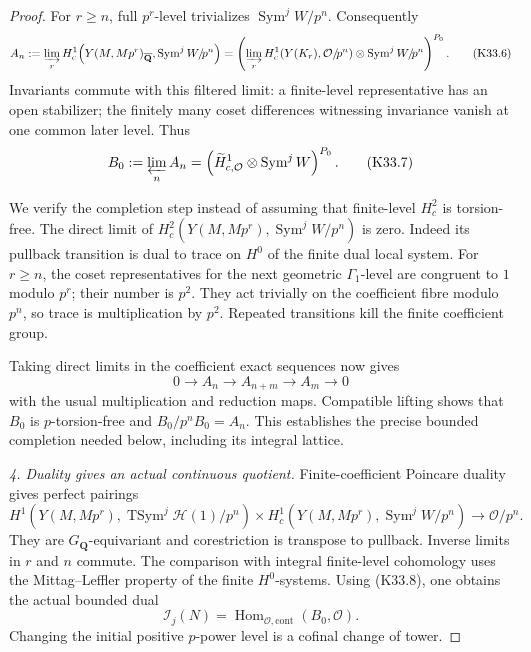 \begin{proof}
For \(r\geq n\), full \(p^r\)-level trivializes
\(\operatorname{Sym}^j W/\!p^n\).  Consequently
\[
 A_n:=\varinjlim_r
 H_c^1\!\left(Y(M,Mp^r)_{\overline{\mathbf Q}},
       \operatorname{Sym}^j W/\!p^n\right)
 =
 \left(\varinjlim_r H_c^1(Y(K_r),\mathcal O/\!p^n)
       \otimes\operatorname{Sym}^j W/\!p^n\right)^{P_0}.
 \tag{K33.6}
\]
Invariants commute with this filtered limit: a finite-level
representative has an open stabilizer; the finitely many
coset differences witnessing invariance vanish at one common
later level.  Thus
\[
 B_0:=\varprojlim_n A_n
   =\left(\widetilde H_{c,\mathcal O}^1
        \otimes\operatorname{Sym}^j W\right)^{P_0}.
 \tag{K33.7}
\]

We verify the completion step instead of assuming that finite-level
\(H_c^2\) is torsion-free.  The direct limit of
\(H_c^2(Y(M,Mp^r),\operatorname{Sym}^j W/\!p^n)\) is zero.
Indeed its pullback transition is dual to trace on \(H^0\) of
the finite dual local system.  For \(r\geq n\), the coset
representatives for the next geometric \(\Gamma_1\)-level
are congruent to \(1\) modulo \(p^r\); their number is \(p^2\).
They act trivially on the coefficient fibre modulo \(p^n\),
so trace is multiplication by \(p^2\).  Repeated transitions
kill the finite coefficient group.

Taking direct limits in the coefficient exact sequences now gives
\[
 0\longrightarrow A_n\longrightarrow A_{n+m}
       \longrightarrow A_m\longrightarrow0
 \tag{K33.8}
\]
with the usual multiplication and reduction maps.
Compatible lifting shows that \(B_0\) is \(p\)-torsion-free
and \(B_0/p^nB_0=A_n\).  This establishes the precise bounded
completion needed below, including its integral lattice.

\emph{4. Duality gives an actual continuous quotient.}
Finite-coefficient Poincare duality gives perfect pairings
\[
 H^1\!\left(Y(M,Mp^r),
       \operatorname{TSym}^j\mathcal H(1)/p^n\right)
 \times
 H_c^1\!\left(Y(M,Mp^r),
       \operatorname{Sym}^jW/p^n\right)
 \longrightarrow\mathcal O/p^n.
 \tag{K33.9}
\]
They are \(G_{\mathbf Q}\)-equivariant and corestriction is
transpose to pullback.  Inverse limits in \(r\) and \(n\)
commute.  The comparison with integral finite-level cohomology
uses the Mittag--Leffler property of the finite \(H^0\)-systems.
Using (K33.8), one obtains the actual bounded dual
\[
 \mathcal I_j(N)
   =\operatorname{Hom}_{\mathcal O,\mathrm{cont}}(B_0,\mathcal O).
 \tag{K33.10}
\]
Changing the initial positive \(p\)-power level is a cofinal
change of tower.


\end{proof}
